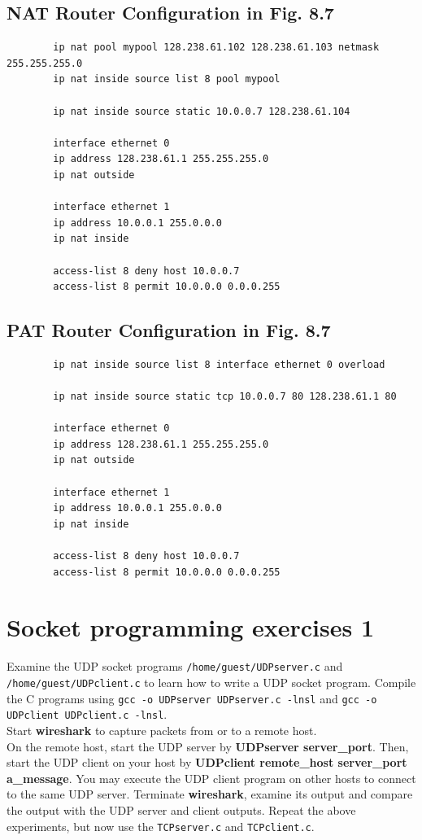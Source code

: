 \documentclass[10pt,a4paper]{article}
\numberwithin{equation}{section}
\numberwithin{figure}{section}
\numberwithin{table}{section}
\begin{document}
    \subsection*{NAT Router Configuration in Fig. 8.7}
    \begin{verbatim}
        ip nat pool mypool 128.238.61.102 128.238.61.103 netmask 255.255.255.0
        ip nat inside source list 8 pool mypool

        ip nat inside source static 10.0.0.7 128.238.61.104

        interface ethernet 0
        ip address 128.238.61.1 255.255.255.0
        ip nat outside

        interface ethernet 1
        ip address 10.0.0.1 255.0.0.0
        ip nat inside

        access-list 8 deny host 10.0.0.7
        access-list 8 permit 10.0.0.0 0.0.0.255
    \end{verbatim}
    \subsection*{PAT Router Configuration in Fig. 8.7}
    \begin{verbatim}
        ip nat inside source list 8 interface ethernet 0 overload

        ip nat inside source static tcp 10.0.0.7 80 128.238.61.1 80

        interface ethernet 0
        ip address 128.238.61.1 255.255.255.0
        ip nat outside

        interface ethernet 1
        ip address 10.0.0.1 255.0.0.0
        ip nat inside

        access-list 8 deny host 10.0.0.7
        access-list 8 permit 10.0.0.0 0.0.0.255
    \end{verbatim}

\iffalse
    \section*{Socket programming exercises 1}
    Examine the UDP socket programs \texttt{/home/guest/UDPserver.c} and \texttt{/home/guest/UDPclient.c} to learn how to write a UDP socket program.
    Compile the C programs using \texttt{gcc -o UDPserver UDPserver.c -lnsl} and \texttt{gcc -o UDPclient UDPclient.c -lnsl}. \\
    Start \textbf{wireshark} to capture packets from or to a remote host. \\
    On the remote host, start the UDP server by \textbf{UDPserver server\_port}.
    Then, start the UDP client on your host by \textbf{UDPclient remote\_host server\_port a\_message}.
    You may execute the UDP client program on other hosts to connect to the same UDP server.
    Terminate \textbf{wireshark}, examine its output and compare the output with the UDP server and client outputs.
    Repeat the above experiments, but now use the \texttt{TCPserver.c} and \texttt{TCPclient.c}.
\end{document}
